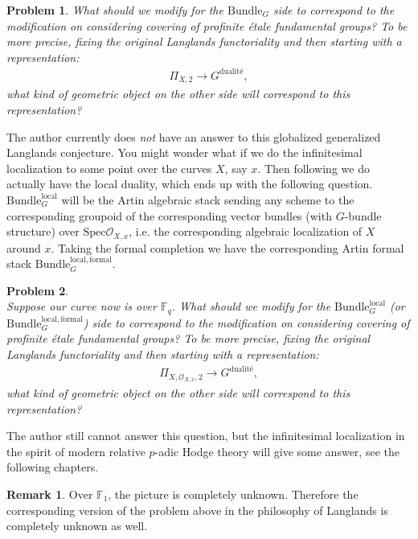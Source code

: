 \documentclass[12pt]{book}
\newtheorem{problem}{Problem}
\theoremstyle{definition}
\newtheorem{remark}{Remark}
\begin{document}
\begin{problem}
What should we modify for the $\mathrm{Bundle}_G$ side to correspond to the modification on considering covering of profinite \'etale fundamental groups? To be more precise, fixing the original Langlands functoriality and then starting with a representation:
\begin{align}
\Pi_{X,2} \rightarrow G^\text{dualit\'e},
\end{align}
what kind of geometric object on the other side will correspond to this representation? 
\end{problem}
The author currently does \textit{not} have an answer to this globalized generalized Langlands conjecture. You might wonder what if we do the infinitesimal localization to some point over the curves $X$, say $x$. Then following \cite{GL} we do actually have the local duality, which ends up with the following question. $\mathrm{Bundle}^\mathrm{local}_G$ will be the Artin algebraic stack sending any scheme to the corresponding groupoid of the corresponding vector bundles (with $G$-bundle structure) over $\mathrm{Spec}\mathcal{O}_{X,x}$, i.e. the corresponding algebraic localization of $X$ around $x$. Taking the formal completion we have the corresponding Artin formal stack $\mathrm{Bundle}^\mathrm{local,formal}_G$.




\begin{problem}\mbox{}\\
Suppose our curve now is over $\mathbb{F}_q$. What should we modify for the $\mathrm{Bundle}^\mathrm{local}_G$ (or $\mathrm{Bundle}^\mathrm{local,formal}_G$) side to correspond to the modification on considering covering of profinite \'etale fundamental groups? To be more precise, fixing the original Langlands functoriality and then starting with a representation:
\begin{align}
\Pi_{X,\mathcal{O}_{X,x},2} \rightarrow G^\text{dualit\'e},
\end{align}
what kind of geometric object on the other side will correspond to this representation? 
\end{problem}

The author still cannot answer this question, but the infinitesimal localization in the spirit of modern relative $p$-adic Hodge theory will give some answer, see the following chapters.

\begin{remark}
Over $\mathbb{F}_1$, the picture is completely unknown. Therefore the corresponding version of the problem above in the philosophy of Langlands is completely unknown as well.
\end{remark}
\end{document}
